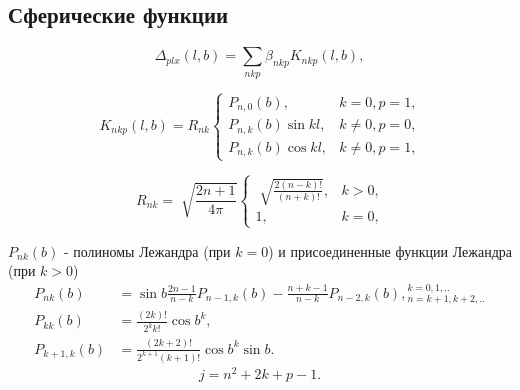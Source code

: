 \documentclass[12pt,aspectratio=43]{beamer}
\begin{document}
\subsection{Сферические функции}\label{sistem}  
\begin{frame}[<alignment>]
\begin{equation}\label{f:sf_prll} 
\Delta_{plx} (l,b) = \sum_{nkp}\beta_{nkp}K_{nkp}(l,b),
\end{equation}

\begin{equation}\label{f:sf_k}
K_{nkp}(l,b) = R_{nk} \left\{ \begin{array}{ll}
P_{n,0}(b), & \textrm{$k=0, p=1$,}\\
P_{n,k}(b)\sin{kl}, & \textrm{$k\neq0, p=0$,}\\
P_{n,k}(b)\cos{kl}, & \textrm{$k\neq0, p=1$,}
\end{array} \right.
\end{equation}

\begin{equation}\label{f:sf_R}
R_{nk} = \sqrt[]{\frac{2n+1}{4\pi}} \left\{ \begin{array}{cc}
\sqrt[]{\frac{2(n-k)!}{(n+k)!}}, & \textrm{$k>0$,}\\
1, & \textrm{$k=0$,}
\end{array} \right.
\end{equation}

$P_{nk}(b)$ - полиномы Лежандра (при $k = 0$) и присоединенные функции Лежандра (при $k > 0$)
\begin{equation}\label{f:sf_pl}
\begin{array}{rll}
P_{nk}(b)&=\sin{b\frac{2n-1}{n-k}}P_{n-1,k}(b)-\frac{n+k-1}{n-k}P_{n-2,k}(b),{}^{k=0,1,..}_{n=k+1,k+2,..}\\
P_{kk}(b)&=\frac{(2k)!}{2^{k}k!}{\cos{b}}^{k},\\
P_{k+1,k}(b)&=\frac{(2k+2)!}{2^{k+1}(k+1)!}{\cos{b}}^{k}\sin{b}.
\end{array}
\end{equation}
\begin{equation}\label{f:sf_j}
j = n^2 + 2k + p -1.
\end{equation}
\end{frame}	
\end{document}
